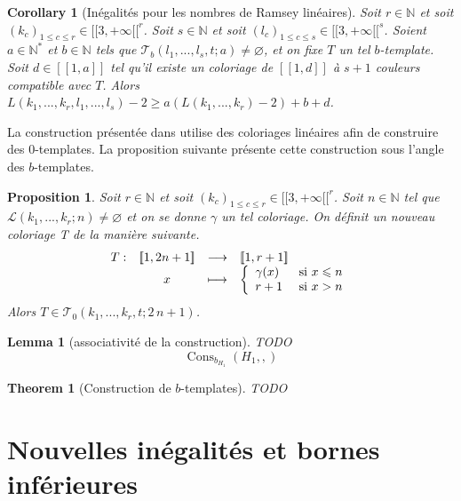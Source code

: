 \documentclass{article}
\newtheorem{theorem}[definition]{Theorem}
\newtheorem{corollary}[definition]{Corollary}
\newtheorem{lemma}[definition]{Lemma}
\newtheorem{proposition}[definition]{Proposition}
\DeclareMathOperator{\cons}{Cons}
\begin{document}
\begin{corollary}[Inégalités pour les nombres de Ramsey linéaires]
Soit \(r \in \mathbb{N}\) et soit \((k_c)_{1 \leqslant c \leqslant r} \in {[\![3, +\infty[\![}^r\). Soit \(s \in \mathbb{N}\) et soit \((l_c)_{1 \leqslant c \leqslant s} \in {[\![3, +\infty[\![}^s\). Soient \(a \in \mathbb{N}^*\) et \(b \in \mathbb{N}\) tels que \(\mathcal{T}_b(l_1, ..., l_s, t; a) \neq \varnothing\), et on fixe \(T\) un tel \(b\)-template. Soit \(d \in [\![1, a]\!]\) tel qu'il existe un coloriage de \([\![1, d]\!]\) à \(s + 1\) couleurs compatible avec \(T\).
Alors \(L(k_1, ..., k_r, l_1, ..., l_s) - 2 \geqslant a (L(k_1, ..., k_r) - 2) + b + d\).
\end{corollary}

La construction présentée dans \cite{rowleyramseyabott} utilise des coloriages linéaires afin de construire des \(0\)-templates. La proposition suivante présente cette construction sous l'angle des \(b\)-templates.
\begin{proposition}
Soit \(r \in \mathbb{N}\) et soit \((k_c)_{1 \leqslant c \leqslant r} \in {[\![3, +\infty[\![}^r\). Soit \(n \in \mathbb{N}\) tel que \(\mathcal{L}(k_1, ..., k_r; n) \neq \varnothing\) et on se donne \(\gamma\) un tel coloriage. On définit un nouveau coloriage T de la manière suivante.
\[\begin{array}{c c c l}
	T : & [\![1, 2 n + 1]\!] & \longrightarrow & [\![1, r + 1]\!] \\
	 & x & \longmapsto & \left\{
		\begin{array}{l l}
			\gamma(x) & ~\text{si}~ x \leqslant n \\
			r + 1 & ~\text{si}~ x > n \\
		\end{array}
		\right.
\end{array}\]
Alors \(T \in \mathcal{T}_0(k_1, ..., k_r, t; 2 \, n + 1)\).
\end{proposition}

\begin{lemma}[associativité de la construction]
TODO
\[
\cons_{b_{H_1}}(H_1, , )
\]
\end{lemma}

\begin{theorem}[Construction de \(b\)-templates]
TODO
\end{theorem}

\section{Nouvelles inégalités et bornes inférieures}
\label{sec:bounds}
\end{document}
